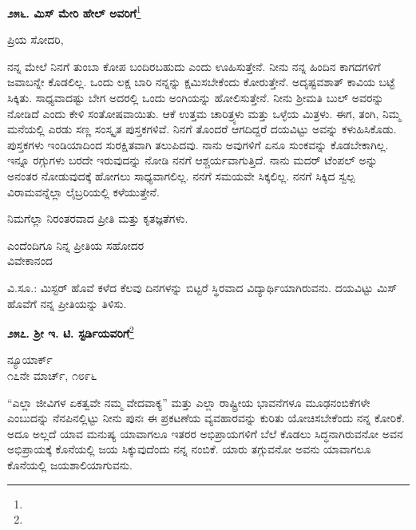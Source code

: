 \begin{center}
\textbf{೨೫೬. ಮಿಸ್ ಮೇರಿ ಹೇಲ್‌ ಅವರಿಗೆ}\footnote{}
\end{center}

\vspace{-0.3cm}

ಪ್ರಿಯ ಸೋದರಿ,

ನನ್ನ ಮೇಲೆ ನಿನಗೆ ತುಂಬಾ ಕೋಪ ಬಂದಿರಬಹುದು ಎಂದು ಊಹಿಸುತ್ತೇನೆ. ನೀನು ನನ್ನ ಹಿಂದಿನ ಕಾಗದಗಳಿಗೆ ಜವಾಬನ್ನೇ ಕೊಡಲಿಲ್ಲ. ಒಂದು ಲಕ್ಷ ಬಾರಿ ನನ್ನನ್ನು ಕ್ಷಮಿಸಬೇಕೆಂದು ಕೋರುತ್ತೇನೆ. ಅದೃಷ್ಟವಶಾತ್‌ ಕಾವಿಯ ಬಟ್ಟೆ ಸಿಕ್ಕಿತು. ಸಾಧ್ಯವಾದಷ್ಟು ಬೇಗ ಅದರಲ್ಲಿ ಒಂದು ಅಂಗಿಯನ್ನು ಹೋಲಿಸುತ್ತೇನೆ. ನೀನು ಶ‍್ರೀಮತಿ ಬುಲ್ ಅವರನ್ನು ನೋಡಿದೆ ಎಂದು ಕೇಳಿ ಸಂತೋಷವಾಯಿತು. ಆಕೆ ಉತ್ತಮ ಚಾರಿತ್ರ್ಯಳು ಮತ್ತು ಒಳ್ಳೆಯ ಮಿತ್ರಳು. ಈಗ, ತಂಗಿ, ನಿಮ್ಮ ಮನೆಯಲ್ಲಿ ಎರಡು ಸಣ್ಣ ಸಂಸ್ಕೃತ ಪುಸ್ತಕಗಳಿವೆ. ನಿನಗೆ ತೊಂದರೆ ಆಗದಿದ್ದರೆ ದಯವಿಟ್ಟು ಅವನ್ನು ಕಳುಹಿಸಿಕೊಡು. ಪುಸ್ತಕಗಳು ಇಂಡಿಯಾದಿಂದ ಸುರಕ್ಷಿತವಾಗಿ ತಲುಪಿದವು. ನಾನು ಅವುಗಳಿಗೆ ಏನೂ ಸುಂಕವನ್ನು ಕೊಡಬೇಕಾಗಿಲ್ಲ. ಇನ್ನೂ ರಗ್ಗುಗಳು ಬರದೇ ಇರುವುದನ್ನು ನೋಡಿ ನನಗೆ ಆಶ್ಚರ್ಯವಾಗುತ್ತಿದೆ. ನಾನು ಮದರ್ ಟೆಂಪಲ್ ಅನ್ನು ಅನಂತರ ನೋಡುವುದಕ್ಕೆ ಹೋಗಲು ಸಾಧ್ಯವಾಗಲಿಲ್ಲ. ನನಗೆ ಸಮಯವೇ ಸಿಕ್ಕಲಿಲ್ಲ. ನನಗೆ ಸಿಕ್ಕಿದ ಸ್ವಲ್ಪ ವಿರಾಮವನ್ನೆಲ್ಲಾ ಲೈಬ್ರರಿಯಲ್ಲಿ ಕಳೆಯುತ್ತೇನೆ.

ನಿಮಗೆಲ್ಲಾ ನಿರಂತರವಾದ ಪ್ರೀತಿ ಮತ್ತು ಕೃತಜ್ಞತೆಗಳು.

\vspace{-0.3cm}

\begin{flushright}
ಎಂದೆಂದಿಗೂ ನಿನ್ನ ಪ್ರೀತಿಯ ಸಹೋದರ\\ವಿವೇಕಾನಂದ
\end{flushright}

ವಿ.ಸೂ.: ಮಿಸ್ಟರ್ ಹೊವೆ ಕಳೆದ ಕೆಲವು ದಿನಗಳನ್ನು ಬಿಟ್ಟರೆ ಸ್ಥಿರವಾದ ವಿದ್ಯಾರ್ಥಿಯಾಗಿರುವನು. ದಯವಿಟ್ಟು ಮಿಸ್ ಹೊವೆಗೆ ನನ್ನ ಪ್ರೀತಿಯನ್ನು ತಿಳಿಸು.

\begin{center}
\textbf{೨೫೭. ಶ‍್ರೀ ಇ. ಟಿ. ಸ್ಟರ್ಡಿಯವರಿಗೆ}\footnote{}
\end{center}

\vspace{-0.7cm}

\begin{flushright}
ನ್ಯೂಯಾರ್ಕ್\\೧೭ನೇ ಮಾರ್ಚ್, ೧೮೯೬
\end{flushright}

“ಎಲ್ಲಾ ಜೀವಿಗಳ ಏಕತ್ವವೇ ನಮ್ಮ ವೇದವಾಕ್ಯ” ಮತ್ತು ಎಲ್ಲಾ ರಾಷ್ಟ್ರೀಯ ಭಾವನೆಗಳೂ ಮೂಢನಂಬಿಕೆಗಳೇ ಎಂಬುದನ್ನು ನೆನಪಿನಲ್ಲಿಟ್ಟು ನೀನು ಪುನಃ ಈ ಪ್ರಕಟಣೆಯ ವ್ಯವಹಾರವನ್ನು ಕುರಿತು ಯೋಚಿಸಬೇಕೆಂದು ನನ್ನ ಕೋರಿಕೆ. ಅದೂ ಅಲ್ಲದೆ ಯಾವ ಮನುಷ್ಯ ಯಾವಾಗಲೂ ಇತರರ ಅಭಿಪ್ರಾಯಗಳಿಗೆ ಬೆಲೆ ಕೊಡಲು ಸಿದ್ಧನಾಗಿರುವನೋ ಅವನ ಅಭಿಪ್ರಾಯಕ್ಕೆ ಕೊನೆಯಲ್ಲಿ ಜಯ ಸಿಕ್ಕುವುದೆಂದು ನನ್ನ ನಂಬಿಕೆ. ಯಾರು ತಗ್ಗುವನೋ ಅವನು ಯಾವಾಗಲೂ ಕೊನೆಯಲ್ಲಿ ಜಯಶಾಲಿಯಾಗುವನು.

